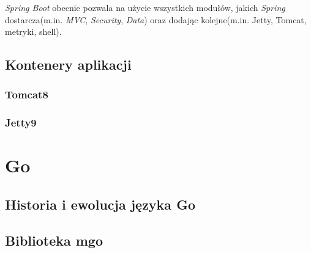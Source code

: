 \textsl{Spring Boot} obecnie pozwala na użycie wszystkich modułów, jakich \textsl{Spring} dostarcza(m.in. \textsl{MVC}, \textsl{Security}, \textsl{Data}) oraz dodając kolejne(m.in. Jetty, Tomcat, metryki, shell). 

\subsection{Kontenery aplikacji}
\subsubsection{Tomcat8}
\subsubsection{Jetty9}

\section{Go}
\subsection{Historia i ewolucja języka Go}
\subsection{Biblioteka mgo}
